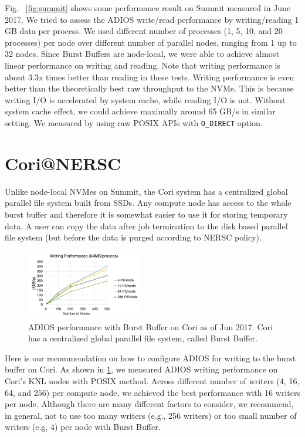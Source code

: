 Fig. ~\ref{fig:summit} shows some performance result on Summit measured in June 2017. We tried to assess the ADIOS write/read performance by writing/reading 1 GB data per process. We used different number of processes (1, 5, 10, and 20 processes) per node over different number of parallel nodes, ranging from 1 up to 32 nodes. Since Burst Buffers are node-local, we were able to achieve almost linear performance on writing and reading.  Note that writing performance is about 3.3x times better than reading in these tests. Writing performance is even better than the theoretically best raw throughput to the NVMe. This is because writing I/O is accelerated by system cache, while reading I/O is not. Without system cache effect, we could achieve maximally around 65 GB/s in similar setting. We measured by using raw POSIX APIs with \verb+O_DIRECT+ option.

\section{Cori@NERSC}

Unlike node-local NVMes on Summit, the Cori system has a centralized global parallel file system built from SSDs. Any compute node has access to the whole burst buffer and therefore it is somewhat easier to use it for storing temporary data. A user can copy the data after job termination to the disk based parallel file system (but before the data is purged according to NERSC policy).

\begin{figure}
\center
\includegraphics[width=0.45\textwidth]{figures/Adios_write_on_Cori.pdf}
\caption{ADIOS performance with Burst Buffer on Cori as of Jun 2017. Cori has a centralized global parallel file system, called Burst Buffer.}
\label{fig:cori}
\end{figure}

Here is our recommendation on how to configure ADIOS for writing to the burst buffer on Cori.
As shown in \ref{fig:cori}, we measured ADIOS writing performance on Cori's KNL nodes with POSIX method. Across different number of writers (4, 16, 64, and 256) per compute node, we achieved the best performance with 16 writers per node. Although there are many different factors to consider, we recommend, in general, not to use too many writers (e.g., 256 writers) or too small number of writers (e.g, 4) per node with Burst Buffer.

